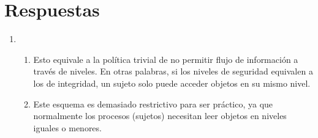 \section{Respuestas}
\begin{enumerate}
  \item 
    \begin{enumerate}
      \item Esto equivale a la política trivial de no permitir flujo de
        información a través de niveles. En otras palabras, si los niveles de
        seguridad equivalen a los de integridad, un sujeto solo puede acceder
        objetos en su mismo nivel.

      \item Este esquema es demasiado restrictivo para ser práctico, ya que
        normalmente los procesos (sujetos) necesitan leer objetos en niveles
        iguales o menores.
    \end{enumerate}
\end{enumerate}
